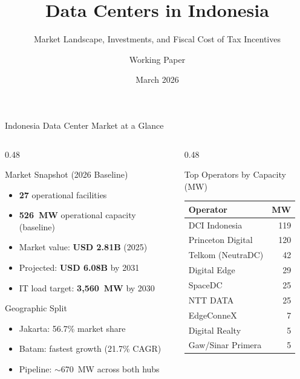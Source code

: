 \documentclass[aspectratio=169,11pt]{beamer}
\title[Indonesia Data Centers]{Data Centers in Indonesia}
\subtitle{Market Landscape, Investments, and Fiscal Cost of Tax Incentives}
\author{Working Paper}
\date{March 2026}
\begin{document}
\begin{frame}
\titlepage
\end{frame}

\begin{frame}{Indonesia Data Center Market at a Glance}

\begin{columns}[T]
\begin{column}{0.48\textwidth}
\begin{block}{Market Snapshot (2026 Baseline)}
\begin{itemize}
    \item \textbf{27} operational facilities
    \item \textbf{526~MW} operational capacity (baseline)
    \item Market value: \textbf{USD 2.81B} (2025)
    \item Projected: \textbf{USD 6.08B} by 2031
    \item IT load target: \textbf{3,560~MW} by 2030
\end{itemize}
\end{block}

\begin{block}{Geographic Split}
\begin{itemize}
    \item Jakarta: 56.7\% market share
    \item Batam: fastest growth (21.7\% CAGR)
    \item Pipeline: $\sim$670~MW across both hubs
\end{itemize}
\end{block}
\end{column}

\begin{column}{0.48\textwidth}
\begin{block}{Top Operators by Capacity (MW)}
\small
\begin{tabular}{lr}
\toprule
\textbf{Operator} & \textbf{MW} \\
\midrule
DCI Indonesia       & 119 \\
Princeton Digital   & 120 \\
Telkom (NeutraDC)   & 42 \\
Digital Edge        & 29 \\
SpaceDC             & 25 \\
NTT DATA            & 25 \\
EdgeConneX          & 7 \\
Digital Realty      & 5 \\
Gaw/Sinar Primera   & 5 \\
\bottomrule
\end{tabular}
\end{block}
\end{column}
\end{columns}

\end{frame}
\end{document}
